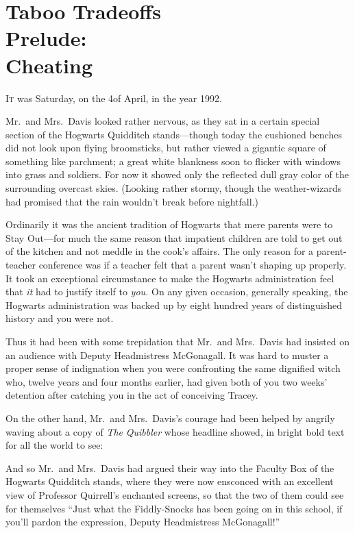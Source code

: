 \chapter[Taboo Tradeoffs Prelude: Cheating]{Taboo Tradeoffs\protect\\Prelude:\protect\\Cheating}

\lettrine{I}{t} was Saturday, on the 4\Th of April, in the year 1992.

\quad Mr.~and Mrs.~Davis looked rather nervous, as they sat in a
certain special section of the Hogwarts Quidditch stands—though
today the cushioned benches did not look upon flying broomsticks,
but rather viewed a gigantic square of something like parchment; a
great white blankness soon to flicker with windows into grass and
soldiers. For now it showed only the reflected dull gray color of
the surrounding overcast skies. (Looking rather stormy, though the
weather-wizards had promised that the rain wouldn’t break before
nightfall.)

Ordinarily it was the ancient tradition of Hogwarts that mere
parents were to Stay Out—for much the same reason that impatient
children are told to get out of the kitchen and not meddle in the
cook’s affairs. The only reason for a parent-teacher conference was
if a teacher felt that a parent wasn’t shaping up properly. It took
an exceptional circumstance to make the Hogwarts administration
feel that \emph{it} had to justify itself to \emph{you.} On any
given occasion, generally speaking, the Hogwarts administration was
backed up by eight hundred years of distinguished history and you
were not.

Thus it had been with some trepidation that Mr.~and Mrs.~Davis
had insisted on an audience with Deputy Headmistress McGonagall. It
was hard to muster a proper sense of indignation when you were
confronting the same dignified witch who, twelve years and four
months earlier, had given both of you two weeks’ detention after
catching you in the act of conceiving Tracey.

On the other hand, Mr.~and Mrs.~Davis’s courage had been helped
by angrily waving about a copy of \emph{The} \emph{Quibbler} whose
headline showed, in bright bold text for all the world to see:


And so Mr.~and Mrs.~Davis had argued their way into the Faculty
Box of the Hogwarts Quidditch stands, where they were now ensconced
with an excellent view of Professor Quirrell’s enchanted screens,
so that the two of them could see for themselves “Just what the
Fiddly-Snocks has been going on in this school, if you’ll pardon
the expression, Deputy Headmistress McGonagall!”

